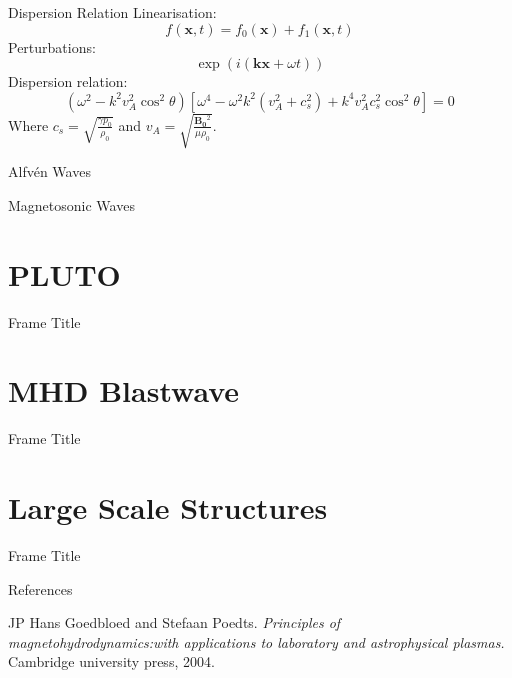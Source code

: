 \documentclass{beamer}
\begin{document}
\begin{frame}{Dispersion Relation}
    Linearisation:
        \begin{equation*}
            f(\mathbf{x},t) = f_0(\mathbf{x}) + f_1(\mathbf{x},t)
        \end{equation*}
    Perturbations:
        \begin{equation*}
            \exp(i(\mathbf{kx} + \omega t))
        \end{equation*}
    Dispersion relation:
        \begin{equation*}
	        (\omega^2 - k^2 v_A^2 \cos^2 \theta)\left[ \omega^{4} - \omega^2k^2(v_A^2 + c_s^2) + k^{4}v_A^2c_s^2\cos^2\theta \right]  = 0
        \end{equation*}
        Where $c_s = \sqrt{\frac{\gamma p_0}{\rho_0}}$ and $v_A = \sqrt{\frac{\mathbf{B_0}^2}{\mu\rho_0}}$.
\end{frame}
\begin{frame}{Alfv\'en Waves}
    
\end{frame}
\begin{frame}{Magnetosonic Waves}
    
\end{frame}
\section{PLUTO}
\begin{frame}{Frame Title}
    
\end{frame}
\section{MHD Blastwave}
\begin{frame}{Frame Title}
    
\end{frame}
\section{Large Scale Structures}
\begin{frame}{Frame Title}
    
\end{frame}

\begin{frame}{References}
    \begin{itemize}\footnotesize{
        \item JP Hans Goedbloed and Stefaan Poedts. \textit{Principles of magnetohydrodynamics:with applications to laboratory and astrophysical plasmas.} Cambridge university press, 2004.
    }
    \end{itemize}
\end{frame}
\end{document}
